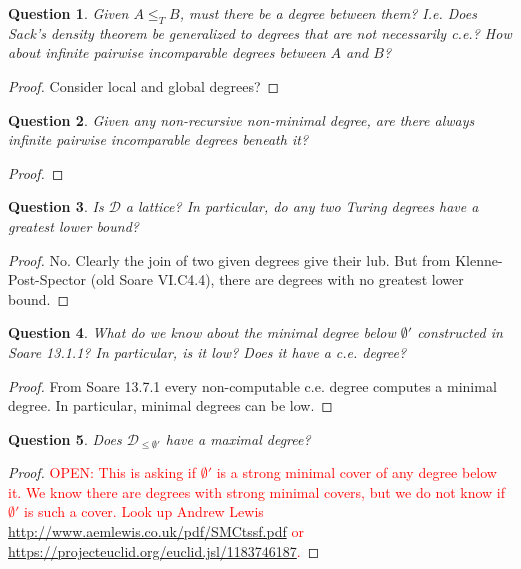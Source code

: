 \documentclass{article}
\newcommand{\OPEN}[1]{\textcolor{red}{OPEN: #1}}
\newtheorem{question}{Question}[subsection]
\begin{document}
    \begin{question}
      Given $A\leq_T B$, must there be a degree between them? I.e. Does
      Sack's density theorem be generalized to degrees that are not
      necessarily c.e.? How about infinite pairwise incomparable degrees
      between $A$ and $B$?
    \end{question}
    \begin{proof}
      Consider local and global degrees?
    \end{proof}

    \begin{question}
      Given any non-recursive non-minimal degree, are there always infinite
      pairwise incomparable degrees beneath it?
    \end{question}
    \begin{proof}
    \end{proof}

    \begin{question}
      Is $\mathcal{D}$ a lattice? In particular, do any two Turing degrees
      have a greatest lower bound?
    \end{question}
    \begin{proof}
      No. Clearly the join of two given degrees give their lub. But from
      Klenne-Post-Spector (old Soare VI.C4.4), there are degrees with no
      greatest lower bound.
    \end{proof}

    \begin{question}
      What do we know about the minimal degree below $\emptyset'$
      constructed in Soare 13.1.1? In particular, is it low? Does it have a
      c.e. degree?
    \end{question}
    \begin{proof}
      From Soare 13.7.1 every non-computable c.e. degree computes a minimal
      degree. In particular, minimal degrees can be low.
    \end{proof}

    \begin{question}
      Does $\mathcal{D}_{\leq\emptyset'}$ have a maximal degree?
    \end{question}
    \begin{proof}
      \OPEN{This is asking if $\emptyset'$ is a strong minimal cover of any
      degree below it. We know there are degrees with strong minimal
      covers, but we do not know if $\emptyset'$ is such a cover. Look up
      Andrew Lewis \url{http://www.aemlewis.co.uk/pdf/SMCtssf.pdf} or
      \url{https://projecteuclid.org/euclid.jsl/1183746187}.}
    \end{proof}
\end{document}

